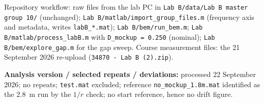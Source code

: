 \documentclass[a4paper,10pt]{article}
\newcommand{\file}[1]{\nolinkurl{#1}}
\begin{document}
Repository workflow: raw files from the lab PC in \file{Lab B/data/Lab B master group 10/}
(unchanged); \file{Lab B/matlab/import_group_files.m} (frequency axis and metadata,
writes \file{labB_*.mat}); \file{Lab B/bem/run_bem.m}; \file{Lab B/matlab/process_labB.m}
with \file{D_mockup = 0.250} (nominal); \file{Lab B/bem/explore_gap.m} for the gap sweep. Course measurement files: the 21 September 2026
re-upload (\texttt{34870 - Lab B (2).zip}).

\textbf{Analysis version / selected repeats / deviations:} processed 22 September 2026;
no repeats; \file{test.mat} excluded; reference \file{no_mockup_1.8m.mat} identified as
the \SI{2.8}{m} run by the $1/r$ check; no start reference, hence no drift figure.
\end{document}
